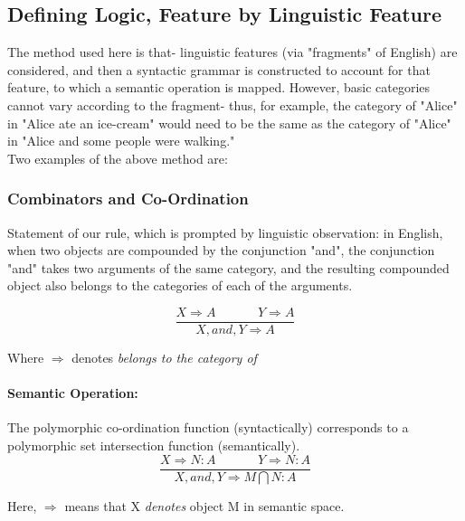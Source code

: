 \documentclass[letterpaper,12pt]{article}
\begin{document}
\subsection{Defining Logic, Feature by Linguistic Feature}

The method used here is that- linguistic features (via "fragments" of English) are considered, and then a syntactic grammar is constructed to account for that feature, to which a semantic operation is mapped. However, basic categories cannot vary according to the fragment- thus, for example, the category of "Alice" in "Alice ate an ice-cream" would need to be the same as the category of "Alice" in "Alice and some people were walking." \\
Two examples of the above method are:
 
\subsubsection{Combinators and Co-Ordination}

Statement of our rule, which is prompted by linguistic observation: in English,
when two objects are compounded by the conjunction "and", the conjunction
"and" takes two arguments of the same category, and the resulting compounded
object also belongs to the categories of each of the arguments.

\begin{equation}
  \frac {X \Rightarrow A \hspace{40pt} Y \Rightarrow A}
  {X, and, Y \Rightarrow A}
\end{equation}

Where $\Rightarrow$ denotes \emph{belongs to the category of}

\paragraph{Semantic Operation:} The polymorphic co-ordination function
(syntactically) corresponds to a polymorphic set intersection function
(semantically).\\

\begin{equation}
  \frac {X \Rightarrow N : A \hspace{40pt} Y \Rightarrow N : A} 
  {X, and, Y \Rightarrow M \bigcap N : A}
\end{equation}

Here, $\Rightarrow$ means that X \emph{denotes} object M in semantic space. 
\end{document}
